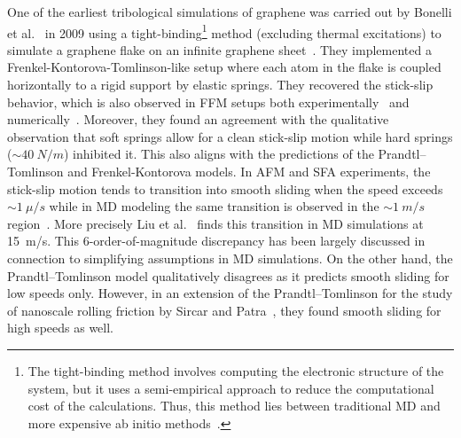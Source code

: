 One of the earliest tribological simulations of graphene was carried out by
Bonelli et al.~\cite{bonelli_atomistic_2009} in 2009 using a tight-binding\footnote{The tight-binding method involves computing the electronic structure of the system, but it uses a semi-empirical approach to reduce the computational cost of the calculations. Thus, this method lies between traditional \acrshort{MD} and more expensive ab initio methods~\cite{colombo_tight-binding_2005}.} method (excluding thermal excitations) to simulate a graphene flake on an
infinite graphene sheet~\cite{penkov_tribology_2014}. They implemented a
Frenkel-Kontorova-Tomlinson-like setup where each atom in the flake is coupled horizontally
to a rigid support by elastic springs. They recovered the stick-slip behavior,
which is also observed in \acrshort{FFM} setups both experimentally~\cite{zhao_thermally_2007, zhang_tuning_2019} and numerically~\cite{li_evolving_2016, zhu_study_2018}. Moreover, they found an agreement with
the qualitative observation that soft springs allow for a clean stick-slip
motion while hard springs ($\sim \SI{40}{N/m}$) inhibited it. This also aligns with the predictions of the Prandtl–Tomlinson and Frenkel-Kontorova models. In \acrshort{AFM} and \acrshort{SFA} experiments,
the stick-slip motion tends to transition into smooth sliding when the speed
exceeds $\sim \SI{1}{\mu/s}$ while in \acrshort{MD} modeling the same transition
is observed in the $\sim \SI{1}{m/s}$ region~\cite{Manini_2016}. More precisely
Liu et al.~\cite{liu_high-speed_2014} finds this transition in \acrshort{MD}
simulations at \SI{15}{m/s}. This 6-order-of-magnitude discrepancy has been
largely discussed in connection to simplifying assumptions in \acrshort{MD}
simulations. On the other hand, the Prandtl–Tomlinson model qualitatively disagrees
as it predicts smooth sliding for low speeds only.
However, in an extension of the Prandtl–Tomlinson for the study of nanoscale rolling friction by Sircar and Patra~\cite{Sircar_2020}, they found smooth sliding for high speeds as well.


